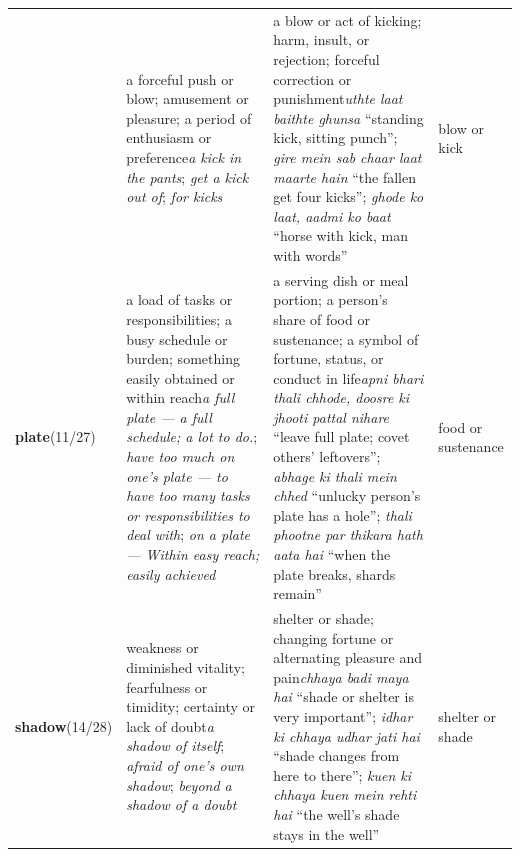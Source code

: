\begin{table}[t]
\begin{tabular}{@{}p{}p{}p{}p{}@{}}
& \textcolor{encolor}{a forceful push or blow; amusement or pleasure; a period of enthusiasm or preference}\newline \textit{a kick in the pants}; \textit{get a kick out of}; \textit{for kicks}
& \textcolor{encolor}{a blow or act of kicking; harm, insult, or rejection; forceful correction or punishment}\newline \textit{uthte laat baithte ghunsa} ``standing kick, sitting punch''; \textit{gire mein sab chaar laat maarte hain} ``the fallen get four kicks''; \textit{ghode ko laat, aadmi ko baat} ``horse with kick, man with words''
& blow or kick \\
\textbf{plate}\newline (11/27)
& \textcolor{encolor}{a load of tasks or responsibilities; a busy schedule or burden; something easily obtained or within reach}\newline \textit{a full plate — a full schedule; a lot to do.}; \textit{have too much on one's plate — to have too many tasks or responsibilities to deal with}; \textit{on a plate — Within easy reach; easily achieved}
& \textcolor{encolor}{a serving dish or meal portion; a person's share of food or sustenance; a symbol of fortune, status, or conduct in life}\newline \textit{apni bhari thali chhode, doosre ki jhooti pattal nihare} ``leave full plate; covet others' leftovers''; \textit{abhage ki thali mein chhed} ``unlucky person's plate has a hole''; \textit{thali phootne par thikara hath aata hai} ``when the plate breaks, shards remain''
& food or sustenance \\
\textbf{shadow}\newline (14/28)
& \textcolor{encolor}{weakness or diminished vitality; fearfulness or timidity; certainty or lack of doubt}\newline \textit{a shadow of itself}; \textit{afraid of one's own shadow}; \textit{beyond a shadow of a doubt}
& \textcolor{encolor}{shelter or shade; changing fortune or alternating pleasure and pain}\newline \textit{chhaya badi maya hai} ``shade or shelter is very important''; \textit{idhar ki chhaya udhar jati hai} ``shade changes from here to there''; \textit{kuen ki chhaya kuen mein rehti hai} ``the well's shade stays in the well''
& shelter or shade \\
\bottomrule
\end{tabular}
\end{table}


